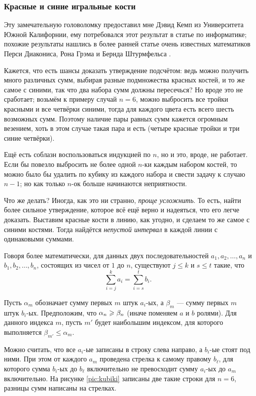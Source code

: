 \subsubsection*{Красные и синие игральные кости}

Эту замечательную головоломку предоставил мне Дэвид Кемп из Университета Южной Калифорнии, ему потребовался этот результат в статье по информатике;
похожие результаты нашлись в более ранней статье очень известных математиков Перси Диакониса, Рона Грэма и Бернда Штурмфельса \cite{14}.

Кажется, что есть шансы доказать утверждение подсчётом: ведь можно получить много различных сумм, выбирая разные подмножества красных костей, и то же самое с синими, так что два набора сумм должны пересечься?
Но вроде это не сработает;
возьмём к примеру случай $n = 6$,  можно выбросить все тройки красными и все четвёрки синими, тогда для каждого цвета есть всего шесть возможных сумм.
Поэтому наличие пары равных сумм кажется огромным везением,
хоть в этом случае такая пара и есть (четыре красные тройки и три синие четвёрки).

Ещё есть соблазн воспользоваться индукцией по $n$, но и это, вроде, не работает.
Если бы повезло выбросить не более одной $n$-ки каждым набором костей,
то можно было бы удалить по кубику из каждого набора и свести задачу к случаю $n-1$;
но как только $n$-ок больше начинаются неприятности.

Что же делать?
Иногда, как это ни странно, \emph{проще усложнить}.
То есть, найти более сильное утверждение, которое всё ещё верно и надеяться, что его легче доказать.
Выставим красные кости в линию, как угодно, и сделаем то же самое с синими костями.
Тогда найдётся \emph{непустой интервал} в каждой линии с одинаковыми суммами.

Говоря более математически, для данных двух последовательностей  $a_1,a_2,\dots,a_n$ и $b_1,b_2,\dots,b_n$, состоящих из чисел от $1$ до $n$, существуют 
$j\le k$ и 
$s\le t$ такие, что 
\[\sum_{i=j}^ka_i=\sum_{i=s}^tb_i.\]

Пусть $\alpha_m$ обозначает сумму первых $m$ штук $a_i$-ых,
а $\beta_m$ --- сумму первых $m$ штук $b_i$-ых.
Предположим, что $\alpha_n\z\ge \beta_n$ (иначе поменяем $a$ и $b$ ролями).
Для данного индекса $m$, пусть $m'$ будет наибольшим индексом, для которого выполняется $\beta_{m'}\le \alpha_m$.

Можно считать, что все $a_i$-ые записаны в строку слева направо, а $b_i$-ые стоят под ними.
При этом от каждого $a_m$ проведена стрелка к самому правому $b_\ell$, для которого сумма $b_i$-ых до $b_\ell$ включительно не превосходит сумму $a_i$-ых до $a_m$ включительно.
На рисунке \ref{pic:kubiki} записаны две такие строки для $n=6$,
разницы сумм написаны на стрелках.

